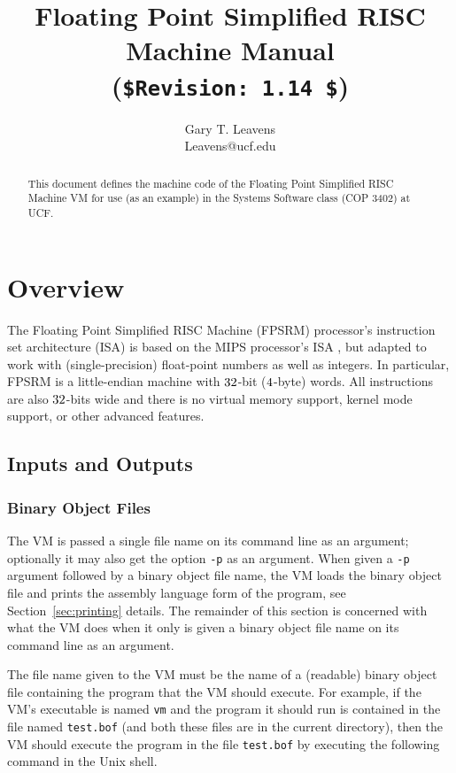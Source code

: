 \documentclass[11pt,letterpaper]{article}
\title{Floating Point Simplified RISC Machine Manual \\
       (\lstinline!$Revision: 1.14 $!)}
\author{Gary T. Leavens \\
        Leavens@ucf.edu}
\newcommand{\secref}[1]{Section~\ref{#1}}  %
\begin{document}
\maketitle
\begin{abstract}
This document defines the machine code of the Floating Point Simplified RISC Machine VM for
use (as an example) in the Systems Software class (COP 3402) at UCF.
\end{abstract}

\section{Overview}

The Floating Point Simplified RISC Machine (FPSRM) processor's
instruction set architecture (ISA) is based on the MIPS processor's ISA
\cite{Kane-Heinrich92}, but adapted to work with (single-precision)
float-point numbers as well as integers.
In particular, FPSRM is a little-endian machine with
$32$-bit ($4$-byte) words.
All instructions are also $32$-bits wide and there is no virtual
memory support, kernel mode support, or other advanced features.

\subsection{Inputs and Outputs}

\subsubsection{Binary Object Files}

The VM is passed a single file name on its command line as an
argument; optionally it may also get the option \texttt{-p} as an argument.
When given a \texttt{-p} argument followed by a binary object file
name, the VM loads the binary object file and prints the assembly
language form of the program, see \secref{sec:printing} details.
The remainder of this section is concerned
with what the VM does when it only is given a binary object file name
on its command line as an argument.

The file name given to the VM must be the name of a (readable)
binary object file containing the program that the VM should execute.
For example, if the VM's executable is named \texttt{vm} and the program it
should run is contained in the file named \texttt{test.bof}
(and both these files are in the current directory), then the VM should
execute the program in the file \texttt{test.bof} by executing
the following command in the Unix shell.
\end{document}
